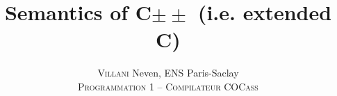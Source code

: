 

\newcommand{\envyields}{\mu,\rho\vdash_\pi}
\newcommand{\modsize}{\mod 2^{64}}

\title{Semantics of C\(\pm\pm\) (i.e. extended C\textminus\textminus)}
\author{\textsc{Villani} Neven, ENS Paris-Saclay\\\textsc{Programmation 1 -- Compilateur COCass}}


\maketitle


